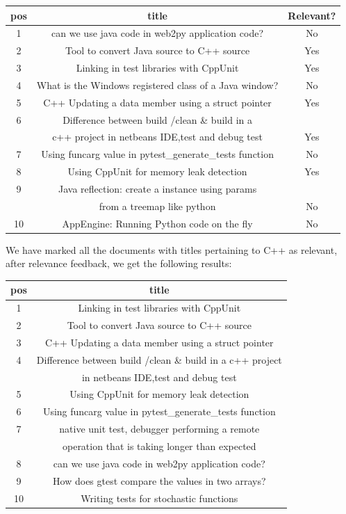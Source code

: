 \documentclass{article}
\begin{document}
\begin{center}
\begin{tabular}{|c|c|c|} \hline
\textbf{pos} & \textbf{title} & \textbf{Relevant?} \\ \hline \hline
1 & can we use java code in web2py application code? & No \\ \hline
2 & Tool to convert Java source to C++ source & Yes \\ \hline
3 & Linking in test libraries with CppUnit & Yes \\ \hline
4 & What is the Windows registered class of a Java window? & No \\ \hline
5 & C++ Updating a data member using a struct pointer & Yes \\ \hline
6 & Difference between build /clean \& build in a & \\ & c++ project in netbeans IDE,test and debug test & Yes \\ \hline
7 & Using funcarg value in pytest\_generate\_tests function & No \\ \hline
8 & Using CppUnit for memory leak detection & Yes \\ \hline
9 & Java reflection: create a instance using params  & \\ & from a treemap like python & No \\ \hline
10 & AppEngine: Running Python code on the fly & No \\ \hline
\end{tabular}
\end{center}

We have marked all the documents with titles pertaining to C++ as relevant, after relevance feedback, we get the following results:\\

\begin{center}
\begin{tabular}{|c|c|} \hline
\textbf{pos} & \textbf{title} \\ \hline \hline
1 & Linking in test libraries with CppUnit \\ \hline
2 & Tool to convert Java source to C++ source \\ \hline
3 & C++ Updating a data member using a struct pointer \\ \hline
4 & Difference between build /clean \& build in a c++ project \\ & in netbeans IDE,test and debug test \\ \hline
5 & Using CppUnit for memory leak detection \\ \hline
6 & Using funcarg value in pytest\_generate\_tests function \\ \hline
7 & native unit test, debugger performing a remote \\ & operation that is taking longer than expected \\ \hline
8 & can we use java code in web2py application code? \\ \hline
9 & How does gtest compare the values in two arrays? \\ \hline
10 & Writing tests for stochastic functions \\ \hline
\end{tabular}
\end{center}
\end{document}
